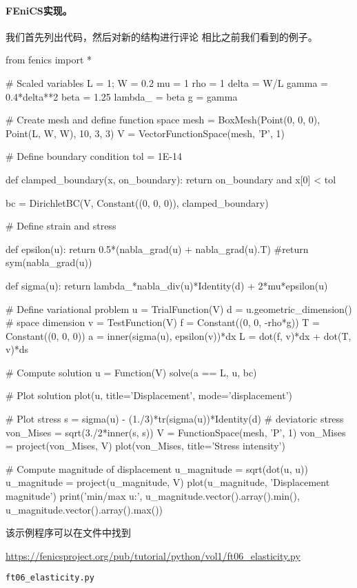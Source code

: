 \paragraph{FEniCS实现。}
我们首先列出代码，然后对新的结构进行评论
相比之前我们看到的例子。

\begin{python}
from fenics import *

# Scaled variables
L = 1; W = 0.2
mu = 1
rho = 1
delta = W/L
gamma = 0.4*delta**2
beta = 1.25
lambda_ = beta
g = gamma

# Create mesh and define function space
mesh = BoxMesh(Point(0, 0, 0), Point(L, W, W), 10, 3, 3)
V = VectorFunctionSpace(mesh, 'P', 1)

# Define boundary condition
tol = 1E-14

def clamped_boundary(x, on_boundary):
    return on_boundary and x[0] < tol

bc = DirichletBC(V, Constant((0, 0, 0)), clamped_boundary)

# Define strain and stress

def epsilon(u):
    return 0.5*(nabla_grad(u) + nabla_grad(u).T)
    #return sym(nabla_grad(u))

def sigma(u):
    return lambda_*nabla_div(u)*Identity(d) + 2*mu*epsilon(u)

# Define variational problem
u = TrialFunction(V)
d = u.geometric_dimension()  # space dimension
v = TestFunction(V)
f = Constant((0, 0, -rho*g))
T = Constant((0, 0, 0))
a = inner(sigma(u), epsilon(v))*dx
L = dot(f, v)*dx + dot(T, v)*ds

# Compute solution
u = Function(V)
solve(a == L, u, bc)

# Plot solution
plot(u, title='Displacement', mode='displacement')

# Plot stress
s = sigma(u) - (1./3)*tr(sigma(u))*Identity(d)  # deviatoric stress
von_Mises = sqrt(3./2*inner(s, s))
V = FunctionSpace(mesh, 'P', 1)
von_Mises = project(von_Mises, V)
plot(von_Mises, title='Stress intensity')

# Compute magnitude of displacement
u_magnitude = sqrt(dot(u, u))
u_magnitude = project(u_magnitude, V)
plot(u_magnitude, 'Displacement magnitude')
print('min/max u:',
      u_magnitude.vector().array().min(),
      u_magnitude.vector().array().max())
\end{python}
该示例程序可以在文件中找到
\begin{center}
  \url{https://fenicsproject.org/pub/tutorial/python/vol1/ft06_elasticity.py}
\end{center}
\begin{center}
  {\nolinkurl{ft06_elasticity.py}}
\end{center}

